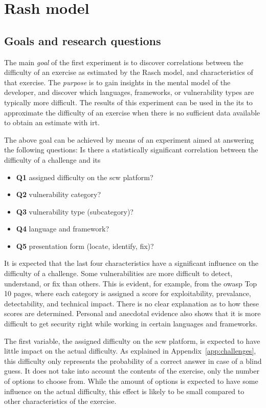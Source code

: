 \section{Rash model}
\label{sec:eval-rasch}

\subsection{Goals and research questions}
The main \textit{goal} of the first experiment is to discover correlations between the difficulty of an exercise as estimated by the Rasch model, and characteristics of that exercise.
The \textit{purpose} is to gain insights in the mental model of the developer, and discover which languages, frameworks, or vulnerability types are typically more difficult.
The results of this experiment can be used in the \gls{its} to approximate the difficulty of an exercise when there is no sufficient data available to obtain an estimate with \gls{irt}.

The above goal can be achieved by means of an experiment aimed at answering the following questions:
Is there a statistically significant correlation between the difficulty of a challenge and its
\begin{itemize}
    \item \textbf{Q1} assigned difficulty on the \gls{scw} platform?
    \item \textbf{Q2} vulnerability category?
    \item \textbf{Q3} vulnerability type (subcategory)?
    \item \textbf{Q4} language and framework?
    \item \textbf{Q5} presentation form (locate, identify, fix)?
\end{itemize}

It is expected that the last four characteristics have a significant influence on the difficulty of a challenge.
Some vulnerabilities are more difficult to detect, understand, or fix than others.
This is evident, for example, from the \gls{owasp} Top 10 pages, where each category is assigned a score for exploitability, prevalance, detectability, and technical impact.
There is no clear explanation as to how these scores are determined.
Personal and anecdotal evidence also shows that it is more difficult to get security right while working in certain languages and frameworks.

The first variable, the assigned difficulty on the \gls{scw} platform, is expected to have little impact on the actual difficulty.
As explained in Appendix~\ref{app:challenges}, this difficulty only represents the probability of a correct answer in case of a blind guess.
It does not take into account the contents of the exercise, only the number of options to choose from.
While the amount of options is expected to have some influence on the actual difficulty, this effect is likely to be small compared to other characteristics of the exercise.

